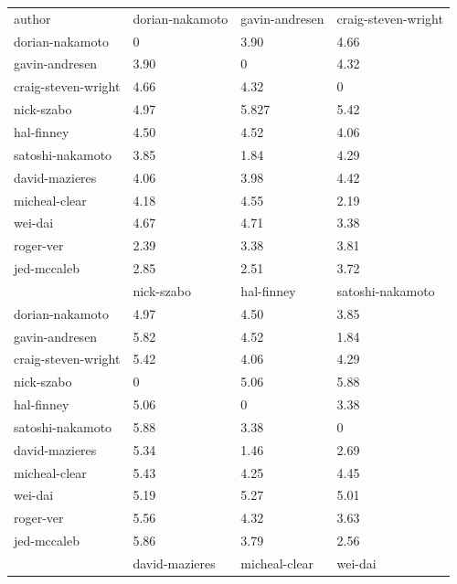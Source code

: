 \documentclass{article}%
\begin{document}
\begin{table}[]
\begin{tabular}{llll}
author              & dorian-nakamoto & gavin-andresen & craig-steven-wright \\
dorian-nakamoto     & 0               & 3.90    & 4.66       \\
gavin-andresen      & 3.90     & 0              & 4.32     \\
craig-steven-wright & 4.66    & 4.32   & 0                   \\
nick-szabo          & 4.97   & 5.827   & 5.42         \\
hal-finney          & 4.50   & 4.52    & 4.06        \\
satoshi-nakamoto    & 3.85    & 1.84    & 4.29         \\
david-mazieres      & 4.06     & 3.98   & 4.42          \\
micheal-clear       & 4.18    & 4.55    & 2.19         \\
wei-dai             & 4.67     & 4.71  & 3.38          \\
roger-ver           & 2.39     & 3.38   & 3.81         \\
jed-mccaleb         & 2.85   & 2.51   & 3.72         \\
                    & nick-szabo      & hal-finney     & satoshi-nakamoto    \\
dorian-nakamoto     & 4.97     & 4.50    & 3.85          \\
gavin-andresen      & 5.82    & 4.52    & 1.84        \\
craig-steven-wright & 5.42    & 4.06    & 4.29         \\
nick-szabo          & 0               & 5.06    & 5.88         \\
hal-finney          & 5.06    & 0              & 3.38         \\
satoshi-nakamoto    & 5.88    & 3.38  & 0                   \\
david-mazieres      & 5.34     & 1.46   & 2.69           \\
micheal-clear       & 5.43     & 4.25    & 4.45         \\
wei-dai             & 5.19     & 5.27    & 5.01        \\
roger-ver           & 5.56     & 4.32    & 3.63          \\
jed-mccaleb         & 5.86     & 3.79    & 2.56        \\
                    & david-mazieres  & micheal-clear  & wei-dai             \\

\end{tabular}
\end{table}
\end{document}
